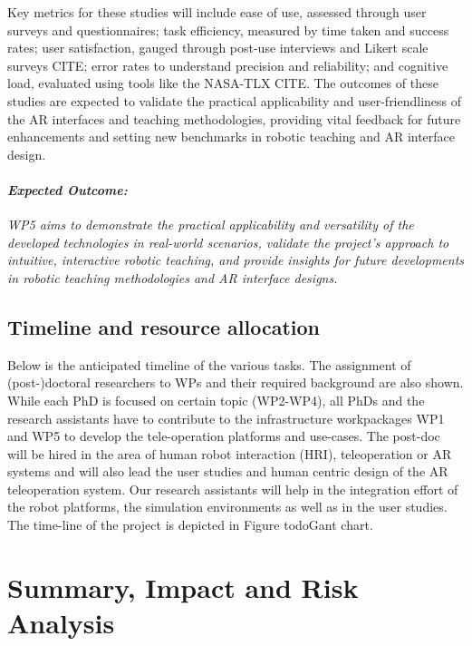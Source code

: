 \documentclass{erc-B2}
\begin{document}
Key metrics for these studies will include ease of use, assessed through user surveys and questionnaires; task efficiency, measured by time taken and success rates; user satisfaction, gauged through post-use interviews and Likert scale surveys CITE; error rates to understand precision and reliability; and cognitive load, evaluated using tools like the NASA-TLX CITE. The outcomes of these studies are expected to validate the practical applicability and user-friendliness of the AR interfaces and teaching methodologies, providing vital feedback for future enhancements and setting new benchmarks in robotic teaching and AR interface design.

\paragraph{\textit{Expected Outcome:}}\textit{
WP5 aims to demonstrate the practical applicability and versatility of the developed technologies in real-world scenarios, validate the project's approach to intuitive, interactive robotic teaching, and provide insights for future developments in robotic teaching methodologies and AR interface designs.}

\subsection{Timeline and resource allocation}
Below is the anticipated timeline of the various tasks. The assignment of (post-)doctoral researchers to WPs and their required background are also shown.  While each PhD is focused on certain topic (WP2-WP4), all PhDs and the research assistants have to contribute to the infrastructure workpackages WP1 and WP5 to develop the tele-operation platforms and use-cases. The post-doc will be hired in the area of human robot interaction (HRI), teleoperation or AR systems and will also lead the user studies and human centric design of the AR teleoperation system. Our research assistants will help in the integration effort of the robot platforms, the simulation environments as well as in the user studies. The time-line of the project is depicted in Figure todo{Gant chart}.




\section{Summary, Impact and Risk Analysis}
\end{document}
